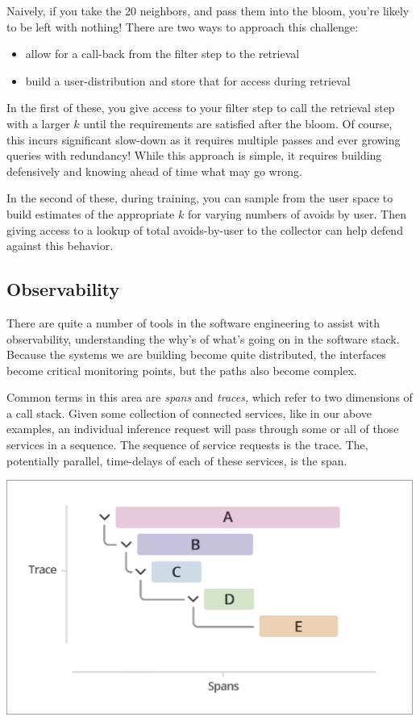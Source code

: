 Naively, if you take the 20 neighbors, and pass them into the bloom, you're likely to be left with nothing! There are two ways to approach this challenge:

\begin{itemize}
\item allow for a call-back from the filter step to the retrieval
\item build a user-distribution and store that for access during retrieval
\end{itemize}

In the first of these, you give access to your filter step to call the retrieval step with a larger $k$ until the requirements are satisfied after the bloom. Of course, this incurs significant slow-down as it requires multiple passes and ever growing queries with redundancy! While this approach is simple, it requires building defensively and knowing ahead of time what may go wrong.

In the second of these, during training, you can sample from the user space to build estimates of the appropriate $k$ for varying numbers of avoids by user. Then giving access to a lookup of total avoids-by-user to the collector can help defend against this behavior.

\subsection{Observability}

There are quite a number of tools in the software engineering to assist with observability, understanding the why's of what's going on in the software stack. Because the systems we are building become quite distributed, the interfaces become critical monitoring points, but the paths also become complex.

Common terms in this area are \emph{spans} and \emph{traces,} which refer to two dimensions of a call stack. Given some collection of connected services, like in our above examples, an individual inference request will pass through some or all of those services in a sequence. The sequence of service requests is the trace. The, potentially parallel, time-delays of each of these services, is the span. 

\includegraphics[width=\textwidth-10pt]{book-text/trace-spans.png}

